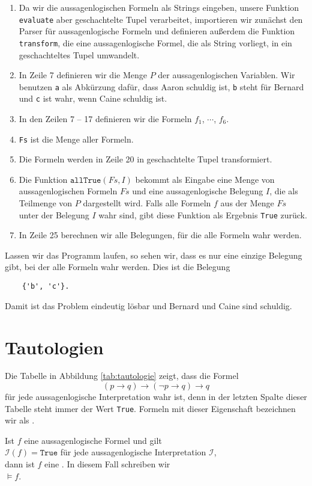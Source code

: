 \begin{enumerate}
\item Da wir die aussagenlogischen Formeln als Strings eingeben, unsere Funktion \texttt{evaluate} aber
      geschachtelte Tupel verarbeitet, importieren wir zunächst den Parser für aussagenlogische Formeln
      und definieren außerdem die Funktion \texttt{transform}, die eine aussagenlogische Formel, die als
      String vorliegt, in ein geschachteltes Tupel umwandelt.
\item In Zeile 7 definieren wir die Menge $P$ der aussagenlogischen Variablen.  Wir benutzen \texttt{a} als
      Abkürzung dafür, dass Aaron schuldig ist, \texttt{b} steht für Bernard und \texttt{c} ist wahr, wenn
      Caine schuldig ist. 
\item In den Zeilen 7 -- 17 definieren wir die Formeln $f_1$, $\cdots$, $f_6$.
\item \texttt{Fs} ist die Menge aller Formeln.
\item Die Formeln werden in Zeile 20 in geschachtelte Tupel transformiert.
\item Die Funktion $\texttt{allTrue}(Fs, I)$ bekommt als Eingabe eine Menge von aussagenlogischen Formeln $Fs$
      und eine aussagenlogische Belegung $I$, die als Teilmenge von $P$ dargestellt wird.  Falls alle Formeln
      $f$ aus der Menge $Fs$ unter der Belegung $I$ wahr sind, gibt diese Funktion als Ergebnis \texttt{True} zurück.
\item In Zeile 25 berechnen wir alle Belegungen, für die alle Formeln wahr werden.
\end{enumerate}
Lassen wir das Programm laufen, so sehen wir, dass es nur eine einzige Belegung gibt, bei der alle Formeln wahr
werden.  Dies ist die Belegung
\begin{verbatim}
    {'b', 'c'}.
\end{verbatim}
Damit ist das Problem eindeutig lösbar und Bernard und Caine sind schuldig.


\section{Tautologien}
Die Tabelle in Abbildung \ref{tab:tautologie} zeigt, dass die Formel
$$  (p \rightarrow q) \rightarrow (\neg p \rightarrow q) \rightarrow q $$
für jede aussagenlogische Interpretation wahr ist, denn in der letzten Spalte dieser Tabelle steht immer der
Wert \texttt{True}.  Formeln mit dieser Eigenschaft bezeichnen wir als .
\begin{Definition}[Tautologie]
  Ist $f$ eine aussagenlogische Formel und gilt \\[0.2cm]
  \hspace*{1.3cm} $\mathcal{I}(f) = \texttt{True}$ \quad für jede aussagenlogische Interpretation $\mathcal{I}$, \\[0.2cm]
  dann ist $f$ eine .  In diesem Fall schreiben wir \\[0.2cm]
  \hspace*{1.3cm} $\models f$.
  \eox
\end{Definition}

